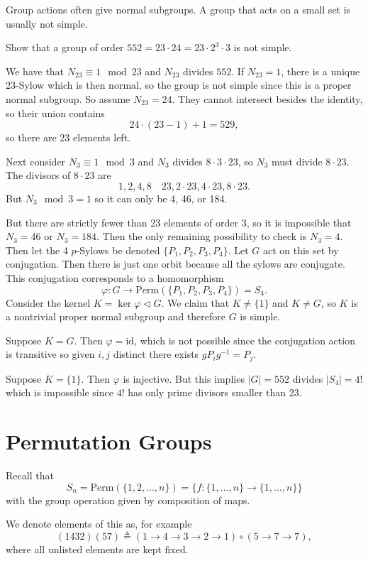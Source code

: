 \documentclass{article}
\begin{document}
Group actions often give normal subgroups. A group that acts on a
small set is usually not simple.

\begin{xmpl}
  Show that a group of order
  $552 = 23 \cdot 24 = 23 \cdot 2^3 \cdot 3$ is not simple.
\end{xmpl}
We have that $N_{23} \equiv 1 \mod 23$ and $N_{23}$ divides $552$.
If $N_{23} = 1$, there is a unique 23-Sylow which is then normal,
so the group is not simple since this is a proper normal subgroup.
So assume $N_{23} = 24$. They cannot intersect besides the identity,
so their union contains
$$
24 \cdot (23 - 1) + 1 = 529,
$$
so there are 23 elements left.

Next consider $N_3 \equiv 1 \mod 3$ and $N_3$ divides
$8 \cdot 3 \cdot 23$, so $N_3$ must divide $8 \cdot 23$. The divisors
of $8 \cdot 23$ are
$$
1, 2, 4, 8 \quad 23, 2 \cdot 23, 4 \cdot 23, 8 \cdot 23.
$$
But $N_3 \mod 3 = 1$ so it can only be 4, 46, or 184.

But there are strictly fewer than 23 elements of order 3, so it is impossible
that $N_3 = 46$ or $N_3 = 184$. Then the only remaining possibility to
check is $N_3 = 4$. Then let the 4 $p$-Sylows be denoted
$\{ P_1, P_2, P_3, P_4 \}$. Let $G$ act on this set by
conjugation. Then there is just one orbit because all the sylows are
conjugate. This conjugation corresponds to a homomorphism
$$
\varphi : G \to \mathrm{Perm}(\{P_1, P_2, P_3, P_4\}) = S_4.
$$
Consider the kernel $K = \ker \varphi \triangleleft G$.
We claim that $K \neq \{ 1 \}$ and $K \neq G$, so $K$ is a
nontrivial proper normal subgroup and therefore $G$ is simple.

Suppose $K = G$. Then $\varphi = \mathrm{id}$, which is not possible
since the conjugation action is transitive so given $i, j$ distinct
there exists $g P_i g^{-1} = P_j$.

Suppose $K = \{ 1 \}$. Then $\varphi$ is injective. But this implies
$|G| = 552$ divides $|S_4| = 4!$ which is impossible since $4!$ has
only prime divisors smaller than 23.

\section*{Permutation Groups}
Recall that
$$
  S_n
= \mathrm{Perm}(\{1, 2, \dots, n\})
= \{ f : \{ 1, \dots, n \} \to \{ 1, \dots, n \} \}
$$
with the group operation given by composition of maps.

We denote elements of this as, for example
$$
  (1432)(57)
\triangleq
  (1 \to 4 \to 3 \to 2 \to 1) \circ (5 \to 7 \to 7),
$$
where all unlisted elements are kept fixed.
\end{document}

